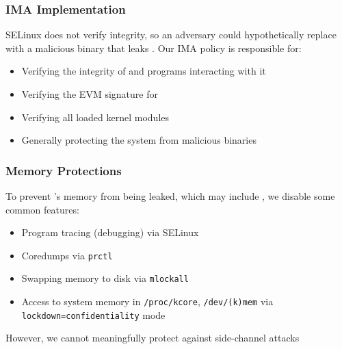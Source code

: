\documentclass[
  notes,
]{beamer}
\begin{document}
\begin{frame}
  \frametitle{IMA Implementation}

  SELinux does not verify integrity, so an adversary could hypothetically replace \tpmsign with a malicious binary that leaks \wcp.
  Our IMA policy is responsible for:
  \begin{itemize}
    \item[\ding{72}] Verifying the integrity of \tpmsign and programs interacting with it
    \item[\ding{72}] Verifying the EVM signature for \wcp
    \item[\ding{72}] Verifying all loaded kernel modules
    \item Generally protecting the system from malicious binaries
  \end{itemize}
\end{frame}
\begin{NoHyper}
\end{NoHyper}

\begin{frame}
  \frametitle{Memory Protections}

  To prevent \tpmsign's memory from being leaked, which may include \wcp,
  we disable some common features:
  \begin{itemize}
    \item Program tracing (debugging) via SELinux
    \item Coredumps via \texttt{prctl}
    \item Swapping memory to disk via \texttt{mlockall}
    \item Access to system memory in \texttt{/proc/kcore}, \texttt{/dev/(k)mem} via \texttt{lockdown=confidentiality} mode
  \end{itemize}
  However, we cannot meaningfully protect against side-channel attacks
\end{frame}
\begin{NoHyper}
\end{NoHyper}
\end{document}
